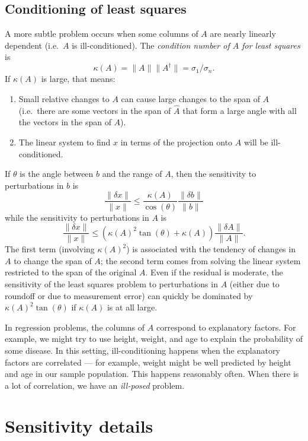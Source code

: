 \documentclass[12pt, leqno]{article} %
\begin{document}
\subsection{Conditioning of least squares}

A more
subtle problem occurs when some columns of $A$ are nearly linearly
dependent (i.e.~$A$ is ill-conditioned).
The {\em condition number of $A$ for least squares} is
\[
  \kappa(A) = \|A\| \|A^\dagger\| = \sigma_1/\sigma_n.
\]
If $\kappa(A)$ is large, that means:
\begin{enumerate}
\item Small relative changes to $A$ can cause large changes to the
  span of $A$ (i.e.~there are some vectors in the span of $\hat A$
  that form a large angle with all the vectors in the span of $A$).
\item The linear system to find $x$ in terms of the projection onto
  $A$ will be ill-conditioned.
\end{enumerate}
If $\theta$ is the angle between $b$ and the range of $A$, then the
sensitivity to perturbations in $b$ is
\[
\frac{\|\delta x\|}{\|x\|} \leq
\frac{\kappa(A)}{\cos(\theta)} \frac{\|\delta b\|}{\|b\|}
\]
while the sensitivity to perturbations in $A$ is
\[
\frac{\|\delta x\|}{\|x\|} \leq
\left( \kappa(A)^2 \tan(\theta) + \kappa(A) \right) \frac{\|\delta A\|}{\|A\|}.
\]
The first term (involving $\kappa(A)^2$) is associated with the tendency
of changes in $A$ to change the span of $A$; the second term comes from
solving the linear system restricted to the span of the original $A$.
Even if the residual is moderate, the sensitivity of the least squares
problem to perturbations in $A$ (either due to roundoff or due to
measurement error) can quickly be dominated by $\kappa(A)^2
\tan(\theta)$ if $\kappa(A)$ is at all large.

In regression problems, the columns of $A$ correspond to explanatory
factors.  For example, we might try to use height, weight, and age to
explain the probability of some disease.  In this setting,
ill-conditioning happens when the explanatory factors are correlated
--- for example, weight might be well predicted by height and
age in our sample population.  This happens reasonably often.  When
there is a lot of correlation, we have an {\em ill-posed} problem.


\section{Sensitivity details}
\end{document}
